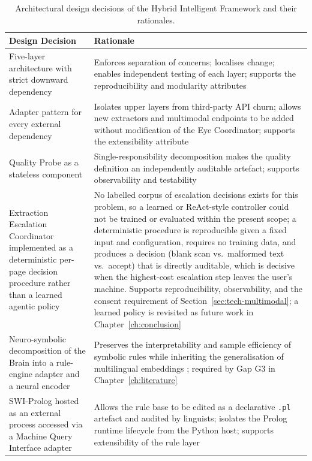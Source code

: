\documentclass[12pt,a4paper,oneside]{report}
\begin{document}
\begin{table}[h]
\centering
\caption{Architectural design decisions of the Hybrid Intelligent Framework and their rationales.}
\label{tab:design-rationale}
\renewcommand{\arraystretch}{1.25}
\footnotesize
\begin{tabularx}{\textwidth}{p{4.6cm} X}
\hline
\textbf{Design Decision} & \textbf{Rationale} \\
\hline
Five-layer architecture with strict downward dependency & Enforces separation of concerns; localises change; enables independent testing of each layer; supports the reproducibility and modularity attributes \\
\hline
Adapter pattern for every external dependency & Isolates upper layers from third-party API churn; allows new extractors and multimodal endpoints to be added without modification of the Eye Coordinator; supports the extensibility attribute \\
\hline
Quality Probe as a stateless component & Single-responsibility decomposition makes the quality definition an independently auditable artefact; supports observability and testability \\
\hline
Extraction Escalation Coordinator implemented as a deterministic per-page decision procedure rather than a learned agentic policy & No labelled corpus of escalation decisions exists for this problem, so a learned or ReAct-style controller \cite{yao2023react} could not be trained or evaluated within the present scope; a deterministic procedure is reproducible given a fixed input and configuration, requires no training data, and produces a decision (blank scan vs.\ malformed text vs.\ accept) that is directly auditable, which is decisive when the highest-cost escalation step leaves the user's machine. Supports reproducibility, observability, and the consent requirement of Section~\ref{sec:tech-multimodal}; a learned policy is revisited as future work in Chapter~\ref{ch:conclusion} \\
\hline
Neuro-symbolic decomposition of the Brain into a rule-engine adapter and a neural encoder & Preserves the interpretability and sample efficiency of symbolic rules \cite{garcez2022neurosymbolic} while inheriting the generalisation of multilingual embeddings \cite{feng2022labse}; required by Gap G3 in Chapter~\ref{ch:literature} \\
\hline
SWI-Prolog hosted as an external process accessed via a Machine Query Interface adapter & Allows the rule base to be edited as a declarative \texttt{.pl} artefact and audited by linguists; isolates the Prolog runtime lifecycle from the Python host; supports extensibility of the rule layer \\

\end{tabularx}
\end{table}
\end{document}
